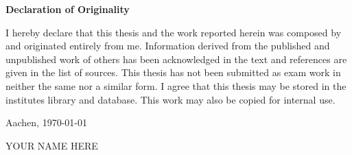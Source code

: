 \Large
\textbf{Declaration of Originality}

\begin{normalsize}
I hereby declare that this thesis and the work reported herein was composed by and originated entirely from me. Information derived from the published and unpublished work of others has been acknowledged in the text and references are given in the list of sources. This thesis has not been submitted as exam work in neither the same nor a similar form. I agree that this thesis may be stored in the institutes library and database. This work may also be copied for internal use. \newline \newline


Aachen, \today \newline \newline

YOUR NAME HERE
\end{normalsize}